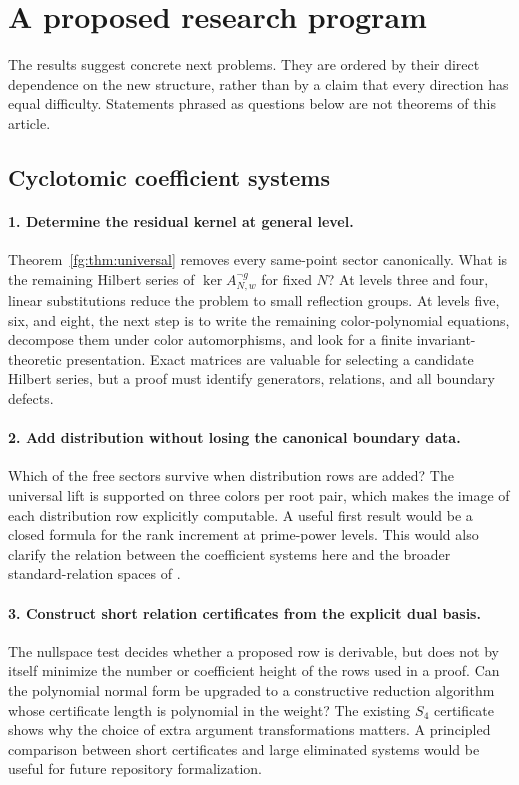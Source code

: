 \section{A proposed research program}
\label{research:sec:program}

The results suggest concrete next problems. They are ordered by their
direct dependence on the new structure, rather than by a claim that
every direction has equal difficulty. Statements phrased as questions
below are not theorems of this article.

\subsection{Cyclotomic coefficient systems}

\paragraph{1. Determine the residual kernel at general level.}
Theorem~\ref{fg:thm:universal} removes every same-point sector
canonically. What is the remaining Hilbert series of
$\ker A_{N,w}^{\neg g}$ for fixed $N$? At levels three and four,
linear substitutions reduce the problem to small reflection groups.
At levels five, six, and eight, the next step is to write the remaining
color-polynomial equations, decompose them under color automorphisms,
and look for a finite invariant-theoretic presentation. Exact matrices
are valuable for selecting a candidate Hilbert series, but a proof
must identify generators, relations, and all boundary defects.

\paragraph{2. Add distribution without losing the canonical boundary data.}
Which of the free sectors survive when distribution rows are added?
The universal lift is supported on three colors per root pair, which
makes the image of each distribution row explicitly computable.
A useful first result would be a closed formula for the rank increment
at prime-power levels. This would also clarify the relation between
the coefficient systems here and the broader standard-relation spaces
of \cite{Zhao2010}.

\paragraph{3. Construct short relation certificates from the explicit dual basis.}
The nullspace test decides whether a proposed row is derivable, but
does not by itself minimize the number or coefficient height of the
rows used in a proof. Can the polynomial normal form be upgraded to
a constructive reduction algorithm whose certificate length is
polynomial in the weight? The existing $S_4$ certificate shows why
the choice of extra argument transformations matters. A principled
comparison between short certificates and large eliminated systems
would be useful for future repository formalization.

